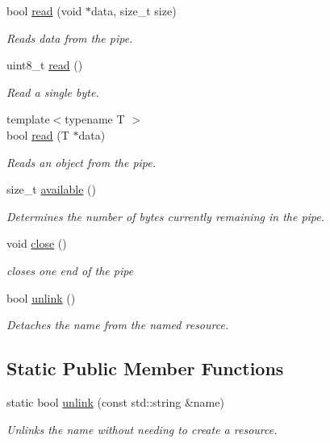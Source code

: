 \begin{DoxyCompactItemize}
bool \hyperlink{classcpen333_1_1process_1_1pipe_ae25219bad758b0b54887addb2d6bd729}{read} (void $\ast$data, size\+\_\+t size)
\begin{DoxyCompactList}\small\item\em Reads data from the pipe. \end{DoxyCompactList}\item 
uint8\+\_\+t \hyperlink{classcpen333_1_1process_1_1pipe_a165e12b1cb0fc16f1732e29b8022d7df}{read} ()
\begin{DoxyCompactList}\small\item\em Read a single byte. \end{DoxyCompactList}\item 
{\footnotesize template$<$typename T $>$ }\\bool \hyperlink{classcpen333_1_1process_1_1pipe_a67c555d0003807fcbc8a3ae1b6ee0f97}{read} (T $\ast$data)
\begin{DoxyCompactList}\small\item\em Reads an object from the pipe. \end{DoxyCompactList}\item 
size\+\_\+t \hyperlink{classcpen333_1_1process_1_1pipe_a5d5e3145f376e1b77e3ebe0580e99fd1}{available} ()
\begin{DoxyCompactList}\small\item\em Determines the number of bytes currently remaining in the pipe. \end{DoxyCompactList}\item 
void \hyperlink{classcpen333_1_1process_1_1pipe_abe03b5f5eacd1546db7a0ef6ffb3ba71}{close} ()
\begin{DoxyCompactList}\small\item\em closes one end of the pipe \end{DoxyCompactList}\item 
bool \hyperlink{classcpen333_1_1process_1_1pipe_addcc650694ad0712637874eb79ec8407}{unlink} ()
\begin{DoxyCompactList}\small\item\em Detaches the name from the named resource. \end{DoxyCompactList}\end{DoxyCompactItemize}
\subsection*{Static Public Member Functions}
\begin{DoxyCompactItemize}
\item 
static bool \hyperlink{classcpen333_1_1process_1_1pipe_ad0d66f9fc3712849b6af36ca7d19e54d}{unlink} (const std\+::string \&name)
\begin{DoxyCompactList}\small\item\em Unlinks the name without needing to create a resource. \end{DoxyCompactList}\end{DoxyCompactItemize}


